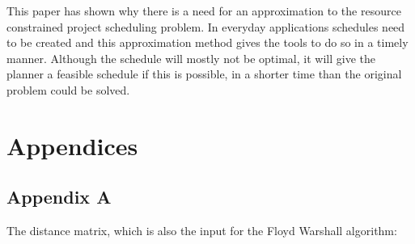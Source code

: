 \documentclass{article}
\theoremstyle{definition}
\begin{document}
This paper has shown why there is a need for an approximation to the resource constrained project scheduling problem.
In everyday applications schedules need to be created and this approximation method gives the tools to do so in a timely manner.
Although the schedule will mostly not be optimal, it will give the planner a feasible schedule if this is possible, in a shorter time than the original problem could be solved.

\newpage



\section*{Appendices}

\subsection*{Appendix A}
\label{appendix:a}
\label{text:appendix}
The distance matrix, which is also the input for the Floyd Warshall algorithm:\\
\end{document}
